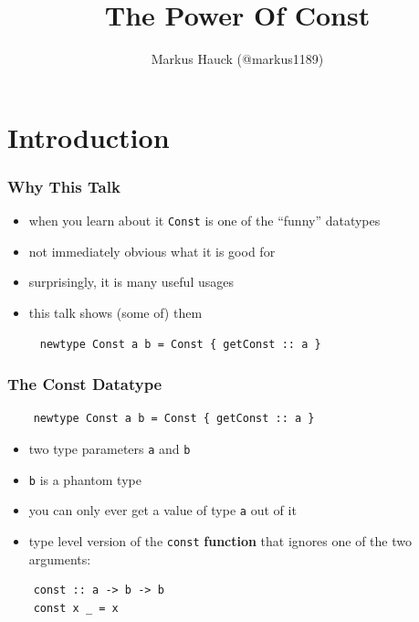 \documentclass[aspectratio=169]{beamer}
\title{The Power Of Const}
\author{Markus Hauck (@markus1189)}
\begin{document}
\begin{frame}
  \titlepage{}
\end{frame}

\section{Introduction}\label{sec:introduction}

\begin{frame}
  \frametitle{Why This Talk}
  \begin{itemize}
  \item when you learn about it \texttt{Const} is one of the ``funny'' datatypes
  \item not immediately obvious what it is good for
  \item surprisingly, it is many useful usages
  \item this talk shows (some of) them
  \end{itemize}
\end{frame}

\begin{frame}[fragile]
  \begin{center}
    \begin{verbatim}
     newtype Const a b = Const { getConst :: a }
    \end{verbatim}
  \end{center}
\end{frame}

\begin{frame}[fragile]
  \frametitle{The Const Datatype}
  \begin{verbatim}
    newtype Const a b = Const { getConst :: a }
  \end{verbatim}
  \vfill
  \begin{itemize}
  \item two type parameters \texttt{a} and \texttt{b}
  \item \texttt{b} is a phantom type
  \item you can only ever get a value of type \texttt{a} out of it
  \item type level version of the \texttt{const} \textbf{function} that ignores one of
    the two arguments:
  \end{itemize}
  \begin{verbatim}
    const :: a -> b -> b
    const x _ = x
  \end{verbatim}
\end{frame}
\end{document}
